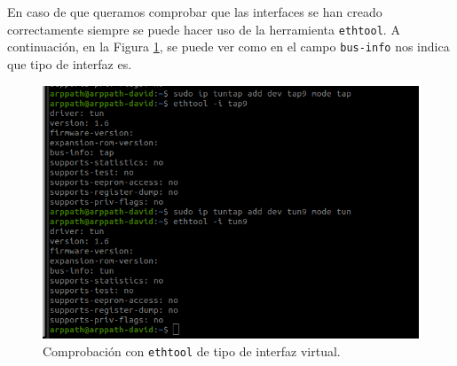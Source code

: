 En caso de que queramos comprobar que las interfaces se han creado correctamente siempre se puede hacer uso de la herramienta \texttt{ethtool}. A continuación, en la Figura \ref{fig:linux2}, se puede ver como en el campo \texttt{bus-info} nos indica que tipo de interfaz es.

\begin{figure}[ht]
    \centering
    \includegraphics[width=\textwidth]{archivos/img/teoria/linux2.png}
    \caption{Comprobación con \texttt{ethtool} de tipo de interfaz virtual.}
    \label{fig:linux2}
\end{figure}


